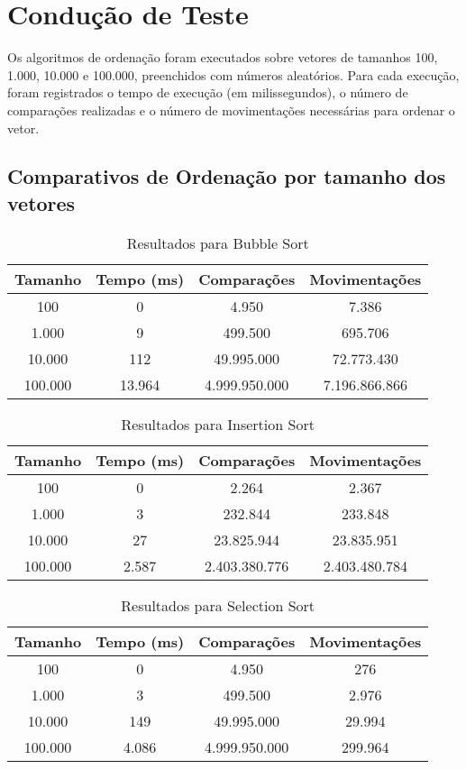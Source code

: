\documentclass[12pt]{article}
\begin{document}
\section{Condução de Teste}

Os algoritmos de ordenação foram executados sobre vetores de tamanhos 100, 1.000, 10.000 e 100.000, preenchidos com números aleatórios. Para cada execução, foram registrados o tempo de execução (em milissegundos), o número de comparações realizadas e o número de movimentações necessárias para ordenar o vetor.

\subsection{Comparativos de Ordenação por tamanho dos vetores}

\begin{table}[H]
\centering
\caption{Resultados para Bubble Sort}
\begin{tabular}{|c|c|c|c|}
\hline
Tamanho & Tempo (ms) & Comparações & Movimentações \\
\hline
100 & 0 & 4.950 & 7.386 \\
1.000 & 9 & 499.500 & 695.706 \\
10.000 & 112 & 49.995.000 & 72.773.430 \\
100.000 & 13.964 & 4.999.950.000 & 7.196.866.866 \\
\hline
\end{tabular}
\end{table}

\begin{table}[H]
\centering
\caption{Resultados para Insertion Sort}
\begin{tabular}{|c|c|c|c|}
\hline
Tamanho & Tempo (ms) & Comparações & Movimentações \\
\hline
100 & 0 & 2.264 & 2.367 \\
1.000 & 3 & 232.844 & 233.848 \\
10.000 & 27 & 23.825.944 & 23.835.951 \\
100.000 & 2.587 & 2.403.380.776 & 2.403.480.784 \\
\hline
\end{tabular}
\end{table}

\begin{table}[H]
\centering
\caption{Resultados para Selection Sort}
\begin{tabular}{|c|c|c|c|}
\hline
Tamanho & Tempo (ms) & Comparações & Movimentações \\
\hline
100 & 0 & 4.950 & 276 \\
1.000 & 3 & 499.500 & 2.976 \\
10.000 & 149 & 49.995.000 & 29.994 \\
100.000 & 4.086 & 4.999.950.000 & 299.964 \\
\hline
\end{tabular}
\end{table}
\end{document}
